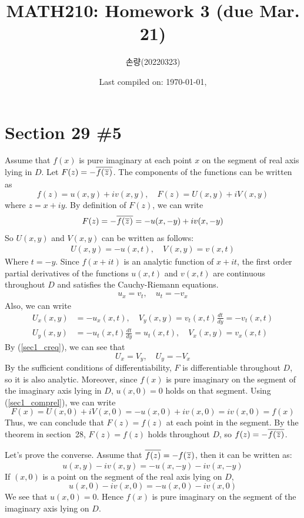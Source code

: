 \documentclass{scrartcl}
\title{MATH210: Homework 3 (due Mar. 21)}
\author{손량(20220323)}
\date{Last compiled on: \today, \currenttime}
\newcommand\Overline[2][0.4pt]{%
  \begin{tikzpicture}[baseline=(a.base)]
    \node[inner xsep=0pt,inner ysep=1.5pt] (a) {$#2$};
    \draw[line width= #1] (a.north west) -- (a.north east);
  \end{tikzpicture}
}
\begin{document}
\maketitle

\section{Section 29 \#5}
Assume that \(f(x)\) is pure imaginary at each point \(x\) on the segment of real axis lying in \(D\).
Let \(F(z) = -\Overline{f(\Overline{z})}\).
The components of the functions can be written as
\[
  f(z) = u(x, y) + iv(x, y), \quad F(z) = U(x, y) + iV(x, y)
\]
where \(z = x + iy\).
By definition of \(F(z)\), we can write
\[
  F(z) = -\Overline{f(\Overline{z})} = -u(x, -y) + iv(x, -y)
\]
So \(U(x, y)\) and \(V(x, y)\) can be written as follows:
\begin{align}\label{sec1_comprel}
  U(x, y) = -u(x, t), \quad V(x, y) = v(x, t)
\end{align}
Where \(t = -y\).
Since \(f(x + it)\) is an analytic function of \(x + it\), the first order partial derivatives of the functions \(u(x, t)\) and \(v(x, t)\) are continuous throughout \(D\) and satisfies the Cauchy-Riemann equations.
\begin{align}\label{sec1_creq}
  u_x = v_t, \quad u_t = -v_x
\end{align}
Also, we can write
\begin{align*}
  U_x(x, y) &= -u_x(x, t), \quad V_y(x, y) = v_t(x, t) \frac{dt}{dy} = -v_t(x, t) \\
  U_y(x, y) &= -u_t(x, t) \frac{dt}{dy} = u_t(x, t), \quad V_x(x, y) = v_x(x, t)
\end{align*}
By (\ref{sec1_creq}), we can see that
\[
  U_x = V_y, \quad U_y = -V_x
\]
By the sufficient conditions of differentiability, \(F\) is differentiable throughout \(D\), so it is also analytic.
Moreover, since \(f(x)\) is pure imaginary on the segment of the imaginary axis lying in \(D\), \(u(x, 0) = 0\) holds on that segment.
Using (\ref{sec1_comprel}), we can write
\[
  F(x) = U(x, 0) + iV(x, 0) = -u(x, 0) + iv(x, 0) = iv(x, 0) = f(x)
\]
Thus, we can conclude that \(F(z) = f(z)\) at each point in the segment.
By the theorem in section~28, \(F(z) = f(z)\) holds throughout \(D\), so \(f(z) = -\Overline{f(\Overline{z})}\).

Let's prove the converse.
Assume that \(\Overline{f(z)} = -f(\Overline{z})\), then it can be written as:
\[
  u(x, y) - iv(x, y) = -u(x, -y) - iv(x, -y)
\]
If \((x, 0)\) is a point on the segment of the real axis lying on \(D\),
\[
  u(x, 0) - iv(x, 0) = -u(x, 0) - iv(x, 0)
\]
We see that \(u(x, 0) = 0\).
Hence \(f(x)\) is pure imaginary on the segment of the imaginary axis lying on \(D\).
\end{document}
